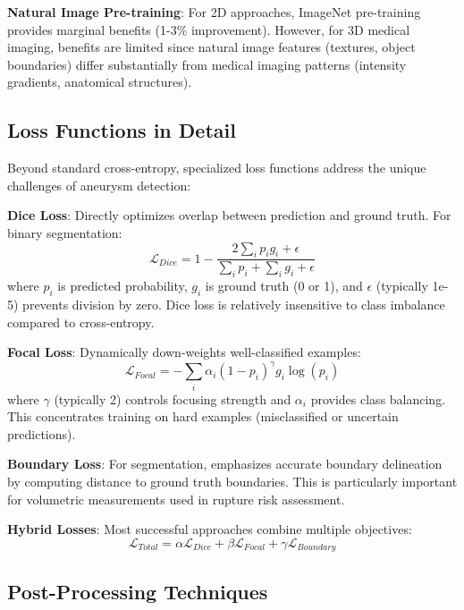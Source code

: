 \documentclass[conference]{IEEEtran}
\begin{document}
\textbf{Natural Image Pre-training}: For 2D approaches, ImageNet pre-training provides marginal benefits (1-3\% improvement). However, for 3D medical imaging, benefits are limited since natural image features (textures, object boundaries) differ substantially from medical imaging patterns (intensity gradients, anatomical structures).

\subsection{Loss Functions in Detail}

Beyond standard cross-entropy, specialized loss functions address the unique challenges of aneurysm detection:

\textbf{Dice Loss}: Directly optimizes overlap between prediction and ground truth. For binary segmentation:
\begin{equation}
\mathcal{L}_{Dice} = 1 - \frac{2\sum_{i} p_i g_i + \epsilon}{\sum_{i} p_i + \sum_{i} g_i + \epsilon}
\end{equation}
where $p_i$ is predicted probability, $g_i$ is ground truth (0 or 1), and $\epsilon$ (typically 1e-5) prevents division by zero. Dice loss is relatively insensitive to class imbalance compared to cross-entropy.

\textbf{Focal Loss}: Dynamically down-weights well-classified examples:
\begin{equation}
\mathcal{L}_{Focal} = -\sum_{i} \alpha_i (1-p_i)^\gamma g_i \log(p_i)
\end{equation}
where $\gamma$ (typically 2) controls focusing strength and $\alpha_i$ provides class balancing. This concentrates training on hard examples (misclassified or uncertain predictions).

\textbf{Boundary Loss}: For segmentation, emphasizes accurate boundary delineation by computing distance to ground truth boundaries. This is particularly important for volumetric measurements used in rupture risk assessment.

\textbf{Hybrid Losses}: Most successful approaches combine multiple objectives:
\begin{equation}
\mathcal{L}_{Total} = \alpha \mathcal{L}_{Dice} + \beta \mathcal{L}_{Focal} + \gamma \mathcal{L}_{Boundary}
\end{equation}

\subsection{Post-Processing Techniques}
\end{document}
